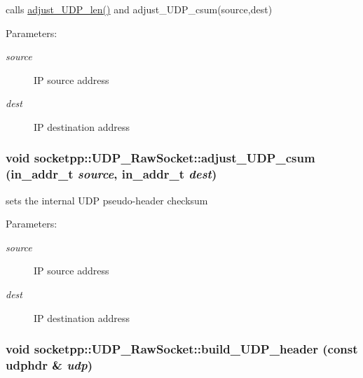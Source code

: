 calls \hyperlink{classsocketpp_1_1UDP__RawSocket_1caa413cfe4f72d8c0aeccdcb10469b5}{adjust\_\-UDP\_\-len()} and adjust\_\-UDP\_\-csum(source,dest) 

\begin{Desc}
\item[Parameters:]
\begin{description}
\item[{\em source}]IP source address \item[{\em dest}]IP destination address \end{description}
\end{Desc}
\hypertarget{classsocketpp_1_1UDP__RawSocket_8d96a58ee9d39e2c014aa81ded23727a}{
\subsubsection[{adjust\_\-UDP\_\-csum}]{\setlength{\rightskip}{0pt plus 5cm}void socketpp::UDP\_\-RawSocket::adjust\_\-UDP\_\-csum (in\_\-addr\_\-t {\em source}, \/  in\_\-addr\_\-t {\em dest})}}
\label{classsocketpp_1_1UDP__RawSocket_8d96a58ee9d39e2c014aa81ded23727a}


sets the internal UDP pseudo-header checksum 

\begin{Desc}
\item[Parameters:]
\begin{description}
\item[{\em source}]IP source address \item[{\em dest}]IP destination address \end{description}
\end{Desc}
\hypertarget{classsocketpp_1_1UDP__RawSocket_b194e3ab2f5b758dee8a0c715d895c1e}{
\subsubsection[{build\_\-UDP\_\-header}]{\setlength{\rightskip}{0pt plus 5cm}void socketpp::UDP\_\-RawSocket::build\_\-UDP\_\-header (const udphdr \& {\em udp})}}
\label{classsocketpp_1_1UDP__RawSocket_b194e3ab2f5b758dee8a0c715d895c1e}


